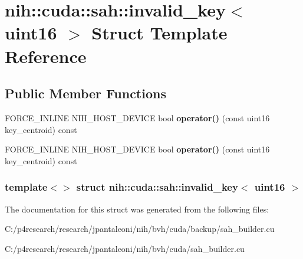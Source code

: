 \hypertarget{structnih_1_1cuda_1_1sah_1_1invalid__key_3_01uint16_01_4}{
\section{nih\-:\-:cuda\-:\-:sah\-:\-:invalid\-\_\-key$<$ uint16 $>$ \-Struct \-Template \-Reference}
\label{structnih_1_1cuda_1_1sah_1_1invalid__key_3_01uint16_01_4}
}
\subsection*{\-Public \-Member \-Functions}
\begin{DoxyCompactItemize}
\item 
\hypertarget{structnih_1_1cuda_1_1sah_1_1invalid__key_3_01uint16_01_4_af510b27f3023c979326860bcd1035864}{
\-F\-O\-R\-C\-E\-\_\-\-I\-N\-L\-I\-N\-E \-N\-I\-H\-\_\-\-H\-O\-S\-T\-\_\-\-D\-E\-V\-I\-C\-E bool {\bfseries operator()} (const uint16 key\-\_\-centroid) const }
\label{structnih_1_1cuda_1_1sah_1_1invalid__key_3_01uint16_01_4_af510b27f3023c979326860bcd1035864}

\item 
\hypertarget{structnih_1_1cuda_1_1sah_1_1invalid__key_3_01uint16_01_4_af510b27f3023c979326860bcd1035864}{
\-F\-O\-R\-C\-E\-\_\-\-I\-N\-L\-I\-N\-E \-N\-I\-H\-\_\-\-H\-O\-S\-T\-\_\-\-D\-E\-V\-I\-C\-E bool {\bfseries operator()} (const uint16 key\-\_\-centroid) const }
\label{structnih_1_1cuda_1_1sah_1_1invalid__key_3_01uint16_01_4_af510b27f3023c979326860bcd1035864}

\end{DoxyCompactItemize}
\subsubsection*{template$<$$>$ struct nih\-::cuda\-::sah\-::invalid\-\_\-key$<$ uint16 $>$}



\-The documentation for this struct was generated from the following files\-:\begin{DoxyCompactItemize}
\item 
\-C\-:/p4research/research/jpantaleoni/nih/bvh/cuda/backup/sah\-\_\-builder.\-cu\item 
\-C\-:/p4research/research/jpantaleoni/nih/bvh/cuda/sah\-\_\-builder.\-cu\end{DoxyCompactItemize}
